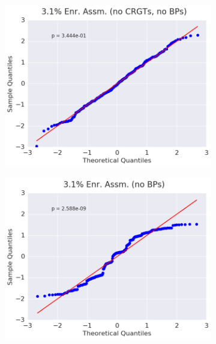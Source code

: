 \begin{figure}[h!]
\centering
\begin{subfigure}{0.5\textwidth}
  \centering
  \includegraphics[width=\linewidth]{figures/patterns/assm-3.1-inf/quantile/assm-31-inf-fiss-2}
  \caption{}
  \label{fig:chap9-qq-assm-3.1-inf-fiss}
\end{subfigure}%
\begin{subfigure}{0.5\textwidth}
  \centering
  \includegraphics[width=\linewidth]{figures/patterns/assm-3.1/quantile/assm-31-fiss-2}
  \caption{}
  \label{fig:chap9-qq-assm-3.1-fiss}
\end{subfigure}
\begin{subfigure}{0.5\textwidth}

\end{subfigure}
\end{figure}
